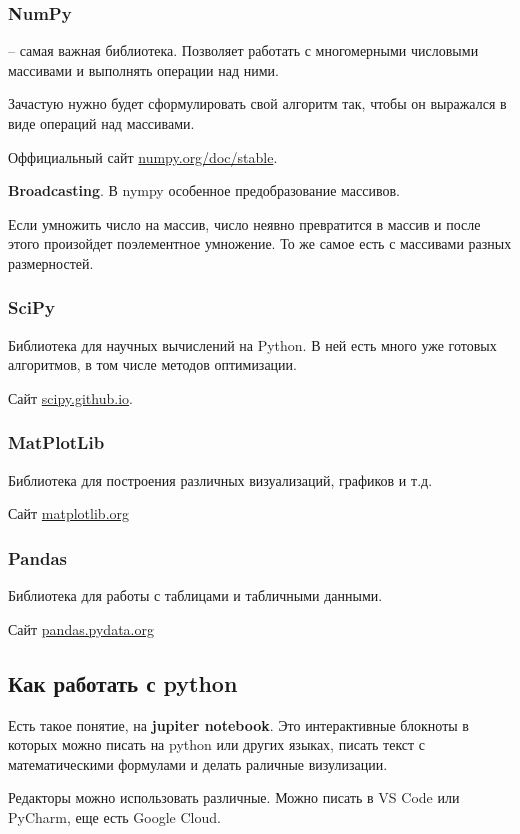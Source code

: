 \subsubsection{NumPy} -- самая важная библиотека.
Позволяет работать с многомерными числовыми массивами и выполнять операции над ними.

Зачастую нужно будет сформулировать свой алгоритм так, чтобы он выражался в виде операций над массивами.

Оффициальный сайт \href{https://numpy.org/doc/stable}{numpy.org/doc/stable}.

\textbf{Broadcasting}.
В nympy особенное предобразование массивов.

Если умножить число на массив, число неявно превратится в массив и после этого произойдет поэлементное умножение.
То же самое есть с массивами разных размерностей.

\subsubsection{SciPy}
Библиотека для научных вычислений на Python.
В ней есть много уже готовых алгоритмов, в том числе методов оптимизации.

Сайт \href{https://scipy.github.io}{scipy.github.io}.

\subsubsection{MatPlotLib}
Библиотека для построения различных визуализаций, графиков и т.д.

Сайт \href{https://matplotlib.org/}{matplotlib.org}

\subsubsection{Pandas}
Библиотека для работы с таблицами и табличными данными.

Сайт \href{https://pandas.pydata.org}{pandas.pydata.org}

\subsection{Как работать с python}
Есть такое понятие, на \textbf{jupiter notebook}.
Это интерактивные блокноты в которых можно писать на python или других языках,
писать текст с математическими формулами и делать раличные визулизации.

Редакторы можно использовать различные.
Можно писать в VS Code или PyCharm, еще есть Google Cloud.

